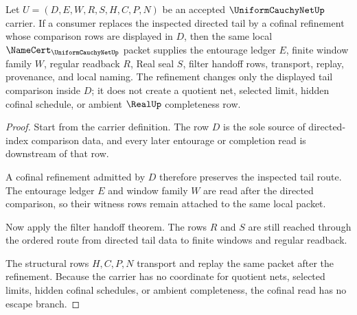 \begin{theorem}
\label{thm:uniform-cauchy-net-directed-tail-stability}
Let $U=(D,E,W,R,S,H,C,P,N)$ be an accepted $\UniformCauchyNetUp$ carrier. If a consumer replaces the inspected directed tail by a cofinal refinement whose comparison rows are displayed in $D$, then the same local $\NameCert_{\UniformCauchyNetUp}$ packet supplies the entourage ledger $E$, finite window family $W$, regular readback $R$, Real seal $S$, filter handoff rows, transport, replay, provenance, and local naming. The refinement changes only the displayed tail comparison inside $D$; it does not create a quotient net, selected limit, hidden cofinal schedule, or ambient $\RealUp$ completeness row.
\end{theorem}
\begin{proof}
Start from the carrier definition. The row $D$ is the sole source of directed-index comparison data, and every later entourage or completion read is downstream of that row.

A cofinal refinement admitted by $D$ therefore preserves the inspected tail route. The entourage ledger $E$ and window family $W$ are read after the directed comparison, so their witness rows remain attached to the same local packet.

Now apply the filter handoff theorem. The rows $R$ and $S$ are still reached through the ordered route from directed tail data to finite windows and regular readback.

The structural rows $H,C,P,N$ transport and replay the same packet after the refinement. Because the carrier has no coordinate for quotient nets, selected limits, hidden cofinal schedules, or ambient completeness, the cofinal read has no escape branch.
\end{proof}



